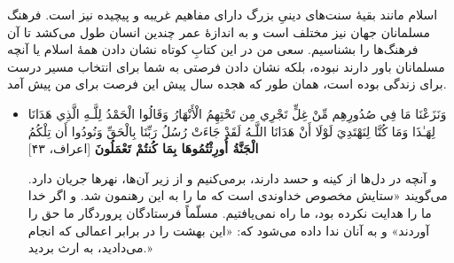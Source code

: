 اسلام مانند بقیهٔ سنت‌های دینیِ بزرگ دارای مفاهیم غریبه و پیچیده نیز است. فرهنگ مسلمانان جهان نیز مختلف است و به اندازهٔ عمر چندین انسان طول می‌کشد تا آن فرهنگ‌ها را بشناسیم. سعی من در این کتابِ کوتاه نشان دادن همهٔ اسلام یا آنچه مسلمانان باور دارند نبوده، بلکه نشان دادن فرصتی به شما برای انتخاب مسیر درست برای زندگی بوده است، همان طور که هجده سال پیش این فرصت برای من پیش آمد.

\begin{itemize}
	\item[]
	{
		وَنَزَعْنَا مَا فِي صُدُورِهِم مِّنْ غِلٍّ تَجْرِي مِن تَحْتِهِمُ الْأَنْهَارُ  وَقَالُوا الْحَمْدُ لِلَّـهِ الَّذِي هَدَانَا لِهَـٰذَا وَمَا كُنَّا لِنَهْتَدِيَ لَوْلَا أَنْ هَدَانَا اللَّـهُ  لَقَدْ جَاءَتْ رُسُلُ رَبِّنَا بِالْحَقِّ  وَنُودُوا أَن تِلْكُمُ {\bfseries الْجَنَّةُ أُورِثْتُمُوهَا بِمَا كُنتُمْ تَعْمَلُونَ} [اعراف، ۴۳]} 
	
	{
		و آنچه در دل‌ها از کینه و حسد دارند، برمی‌کنیم و از زیر آن‌ها، نهرها جریان دارد. می‌گویند «ستایش مخصوص خداوندی است که ما را به این رهنمون شد. و اگر خدا ما را هدایت نکرده بود، ما راه نمی‌یافتیم. مسلّماً فرستادگان پروردگار ما حق را آوردند» و به آنان ندا داده می‌شود که: «این بهشت را در برابر اعمالی که انجام می‌دادید، به ارث بردید.» }
\end{itemize}







